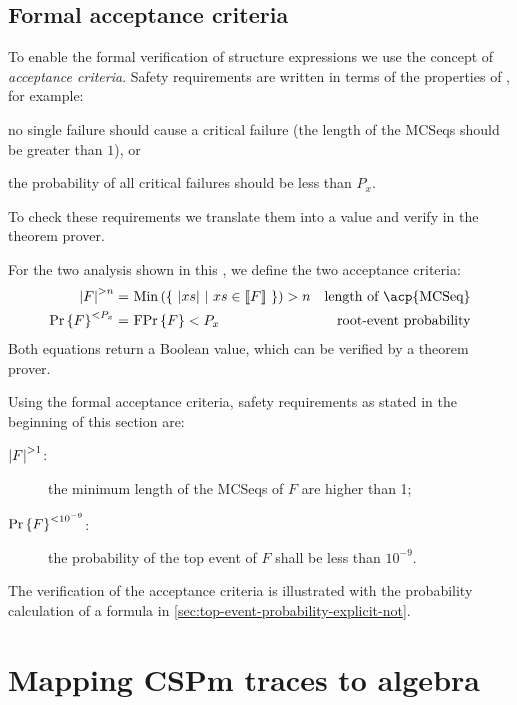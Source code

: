 \subsection{Formal acceptance criteria}
\label{sec:formal-acceptance-criteria}

To enable the formal verification of structure expressions we use the concept of \emph{acceptance criteria}.
Safety requirements are written in terms of the properties of , for example: 
\begin{alineasinline}
  \item no single failure should cause a critical failure (the length of the \acp{MCSeq} should be greater than $1$), or 
  \item the probability of all critical failures should be less than $P_x$.
\end{alineasinline}
To check these requirements we translate them into a value and verify in the theorem prover.

For the two analysis shown in this , we define the two acceptance criteria:
%
\begin{subequations}
\begin{align}
\lengthacceptance{F}{n} = &~ \Min{\left\{~ \length{xs} ~\middle|~ xs \in \denote{F} ~\right\}} > n & \text{length of \acp{MCSeq}}\\
%
\probacceptance{F}{P_x} = &~ \formulaprob{F} < P_x & \text{root-event probability}
\end{align}
\end{subequations}
%
Both equations return a Boolean value, which can be verified by a theorem prover.

Using the formal acceptance criteria, safety requirements as stated in the beginning of this section are:
%
\begin{description}
	\item[$\left|F\right|^{>1}$:] the minimum length of the \acp{MCSeq} of $F$ are higher than 1;
	\item[$\Pr\left\{F\right\}^{<10^{-9}}$: ] the probability of the top event of $F$ shall be less than $10^{-9}$.
\end{description}

The verification of the acceptance criteria is illustrated with the probability calculation of a formula in \cref{sec:top-event-probability-explicit-not}.

\section[Mapping CSPm traces to ATF]{Mapping \ac*{CSPm} traces to \ac*{algebra}}
\label{sec:mapping-cspm-algebra}

